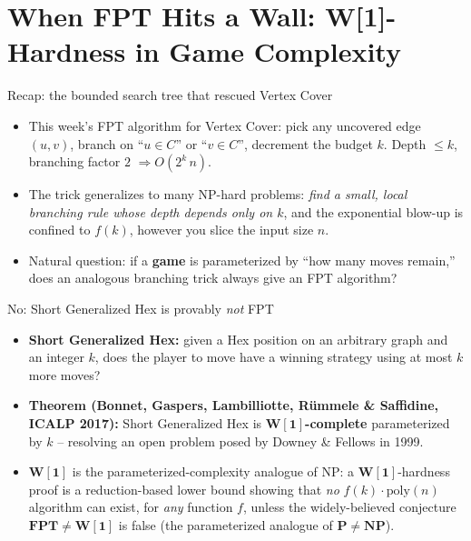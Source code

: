 \documentclass[11pt,aspectratio=169]{beamer}
\begin{document}
\section{When FPT Hits a Wall: W{[}1{]}-Hardness in Game Complexity}

\begin{frame}{Recap: the bounded search tree that rescued Vertex Cover}
  \begin{itemize}
    \item This week's FPT algorithm for Vertex Cover: pick any uncovered edge
    $(u,v)$, branch on ``$u\in C$'' or ``$v\in C$'', decrement the budget $k$. Depth
    $\le k$, branching factor $2$ $\Rightarrow O(2^k\,n)$.
    \item The trick generalizes to many NP-hard problems: \emph{find a small, local
    branching rule whose depth depends only on $k$}, and the exponential blow-up is
    confined to $f(k)$, however you slice the input size $n$.
    \item Natural question: if a \textbf{game} is parameterized by ``how many moves
    remain,'' does an analogous branching trick always give an FPT algorithm?
  \end{itemize}
\end{frame}

\begin{frame}{No: Short Generalized Hex is provably \emph{not} FPT}
  \begin{itemize}
    \item \textbf{Short Generalized Hex:} given a Hex position on an arbitrary graph
    and an integer $k$, does the player to move have a winning strategy using at most
    $k$ more moves?
    \item \textbf{Theorem (Bonnet, Gaspers, Lambilliotte, R\"ummele \& Saffidine,
    ICALP 2017):} Short Generalized Hex is $\mathbf{W[1]}$\textbf{-complete}
    parameterized by $k$ -- resolving an open problem posed by Downey \& Fellows in
    1999.
    \item $\mathbf{W[1]}$ is the parameterized-complexity analogue of NP: a
    $\mathbf{W[1]}$-hardness proof is a reduction-based lower bound showing that
    \emph{no} $f(k)\cdot\mathrm{poly}(n)$ algorithm can exist, for \emph{any} function
    $f$, unless the widely-believed conjecture $\mathbf{FPT} \neq \mathbf{W[1]}$ is
    false (the parameterized analogue of $\mathbf{P} \neq \mathbf{NP}$).
  \end{itemize}
\end{frame}
\end{document}

